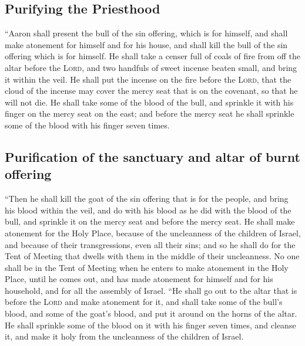 \hypertarget{purifying-the-priesthood}{%
\subsection{Purifying the Priesthood}\label{purifying-the-priesthood}}

 ``Aaron shall present the bull of the sin offering,
which is for himself, and shall make atonement for himself and for his
house, and shall kill the bull of the sin offering which is for himself.
 He shall take a censer full of coals of fire from off
the altar before the \textsc{Lord}, and two handfuls of sweet incense
beaten small, and bring it within the veil.  He shall put
the incense on the fire before the \textsc{Lord}, that the cloud of the
incense may cover the mercy seat that is on the covenant, so that he
will not die.  He shall take some of the blood of the
bull, and sprinkle it with his finger on the mercy seat on the east; and
before the mercy seat he shall sprinkle some of the blood with his
finger seven times.

\hypertarget{purification-of-the-sanctuary-and-altar-of-burnt-offering}{%
\subsection{Purification of the sanctuary and altar of burnt
offering}\label{purification-of-the-sanctuary-and-altar-of-burnt-offering}}

 ``Then he shall kill the goat of the sin offering that
is for the people, and bring his blood within the veil, and do with his
blood as he did with the blood of the bull, and sprinkle it on the mercy
seat and before the mercy seat.  He shall make atonement
for the Holy Place, because of the uncleanness of the children of
Israel, and because of their transgressions, even all their sins; and so
he shall do for the Tent of Meeting that dwells with them in the middle
of their uncleanness.  No one shall be in the Tent of
Meeting when he enters to make atonement in the Holy Place, until he
comes out, and has made atonement for himself and for his household, and
for all the assembly of Israel.  ``He shall go out to the
altar that is before the \textsc{Lord} and make atonement for it, and
shall take some of the bull's blood, and some of the goat's blood, and
put it around on the horns of the altar.  He shall
sprinkle some of the blood on it with his finger seven times, and
cleanse it, and make it holy from the uncleanness of the children of
Israel.

